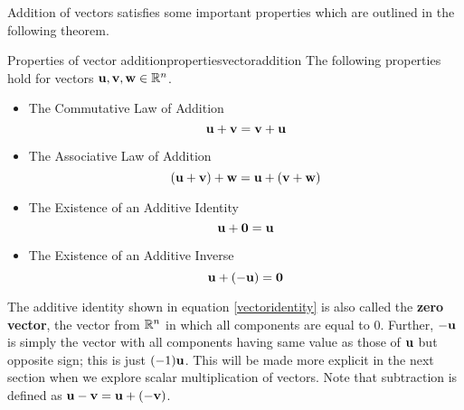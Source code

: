 Addition of vectors satisfies some important properties which are outlined in the following theorem.  

\begin{theorem}{Properties of vector addition}{propertiesvectoraddition}
The following properties hold for vectors ${\bf u},{\bf v}, {\bf w} \in \mathbb{R}^{n}$.
\begin{itemize}
\item The Commutative Law of Addition
\begin{equation*}
{\bf u}+{\bf v}={\bf v}+{\bf u}
\end{equation*}
\item The Associative Law of Addition
\begin{equation*}
\left( {\bf u}+{\bf v}\right) +{\bf w}={\bf u}+\left( {\bf v}+{\bf w}\right)
\end{equation*}
\item The Existence of an Additive Identity
\begin{equation}
{\bf u}+{\bf 0}={\bf u}
\label{vectoridentity} 
\end{equation}
\item The Existence of an Additive Inverse
\begin{equation*}
{\bf u}+\left( -{\bf u}\right) ={\bf 0}  
\end{equation*}
\end{itemize}
\end{theorem}

The additive identity shown in equation
\ref{vectoridentity} is also called the \textbf{zero vector}, 
the vector from $\mathbb{R}^{n}$ in which all components are equal to $0$.
Further, $-{\bf u}$ is simply the vector with all components having
same value as those of ${\bf u}$ but opposite sign; this is just
$(-1){\bf u}$. This will be made more explicit in the next
section when we explore scalar multiplication of vectors. Note that subtraction is defined as ${\bf u}-{\bf v} = {\bf u}+\left(
-{\bf v} \right)$.
